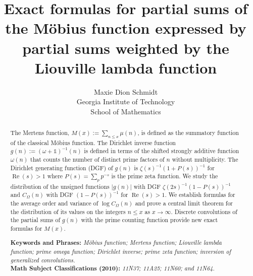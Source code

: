 \documentclass[11pt,reqno,a4letter]{article}
\title{
       Exact formulas for partial sums of the M\"obius function expressed by 
       partial sums weighted by the Liouville lambda function
}
\author{Maxie Dion Schmidt \\
        Georgia Institute of Technology \\
        School of Mathematics
}
\date{}
\numberwithin{equation}{section}
\numberwithin{figure}{section}
\numberwithin{table}{section}
\theoremstyle{plain}
\numberwithin{theorem}{section}
\theoremstyle{definition}
\theoremstyle{remark}
\renewcommand{\Re}{\operatorname{Re}}
\begin{document}
 

\maketitle

\begin{abstract} 
\noindent  
The Mertens function, $M(x) := \sum_{n \leq x} \mu(n)$, is 
defined as the summatory function of the classical M\"obius function.
The Dirichlet inverse function $g(n) := (\omega+\mathds{1})^{-1}(n)$
is defined in terms of the shifted strongly additive function $\omega(n)$ that counts the 
number of distinct prime factors of $n$ without multiplicity. 
The Dirichlet generating function (DGF) of $g(n)$ is $\zeta(s)^{-1} (1+P(s))^{-1}$ 
for $\Re(s) > 1$ where $P(s) = \sum_p p^{-s}$ is the prime zeta function. 
We study the distribution of the unsigned functions $|g(n)|$ with 
DGF $\zeta(2s)^{-1}(1-P(s))^{-1}$ 
and $C_{\Omega}(n)$ with DGF 
$(1-P(s))^{-1}$ for $\Re(s) > 1$. 
We establish formulas for the average order and variance of 
$\log C_{\Omega}(n)$ and prove a central limit theorem 
for the distribution of its values on the 
integers $n \leq x$ as $x \rightarrow \infty$. 
Discrete convolutions of the partial sums of $g(n)$ with the prime counting function 
provide new exact formulas for $M(x)$. 

\bigskip\noindent
\textbf{Keywords and Phrases:} {\it M\"obius function; Mertens function; 
                                    Liouville lambda function; prime omega function; 
                                    Dirichlet inverse; prime zeta function; 
				                inversion of generalized convolutions. } \\[0.05cm] 
\textbf{Math Subject Classifications (2010):} {\it 11N37; 11A25; 11N60; and 11N64. } 
\end{abstract} 

\end{document}
